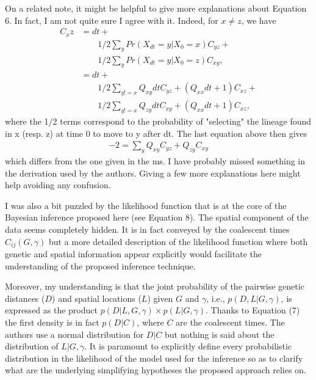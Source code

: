 \reply{
}

\begin{point}{}
    On a related note, it might be helpful to give more explanations about Equation 6. In
    fact, I am not quite sure I agree with it. Indeed, for $x \neq z$, we have
    \begin{align*}
        C_xz &= dt + {} \\
                & \qquad
             1/2 \sum_y Pr(X_{dt} = y | X_0 = x) C_{yz} + {} \\
                & \qquad
             1/2 \sum_y Pr(X_{dt} = y | X_0 = z) C_{xy}, \\
           &= dt + {} \\
                & \qquad
             1/2 \sum_{y != x} Q_{xy} dt C_{yz} + (Q_{xx} dt + 1) C_{xz} + \\
                & \qquad
             1/2 \sum_{y != x} Q_{zy} dt C_{xy} + (Q_{xx} dt + 1) C_{xz},
    \end{align*}
    where the 1/2 terms correspond to the probability of "selecting" the lineage found in x
    (resp. z) at time 0 to move to y after dt. The last equation above then gives
    \begin{align*}
        -2 = \sum_y Q_{xy} C_{yz} + Q_{zy} C_{xy}
    \end{align*}
    which differs from the one given in the ms. I have probably missed something in the derivation
    used by the authors. Giving a few more explanations here might help avoiding any confusion.
\end{point}

\reply{
}



\begin{point}{}
    I was also a bit puzzled by the likelihood function that is at the core of the
    Bayesian inference proposed here (see Equation 8). The spatial component of
    the data seems completely hidden. It is in fact conveyed by the coalescent
    times $C_{ij}(G,\gamma)$ but a more detailed description of the likelihood
    function where both genetic and spatial information appear explicitly would
    facilitate the understanding of the proposed inference technique.
\end{point}

\begin{point}{}
    Moreover, my understanding is that the joint probability of the pairwise genetic distances
    ($D$) and spatial locations ($L$) given $G$ and $\gamma$, i.e.,
    $p(D,L|G,\gamma)$, is expressed as the product 
    $p(D|L,G,\gamma) \times p(L|G,\gamma)$.  Thanks to Equation (7) the first density is in fact
    $p(D|C)$, where $C$ are the coalescent times. The authors use a normal distribution for $D|C$ but
    nothing is said  about the distribution of $L|G,\gamma$. It is paramount to explicitly define
    every probabilistic distribution in the likelihood of the model used for the inference so as
    to clarify what are the underlying simplifying hypotheses the proposed approach relies on.
\end{point}

